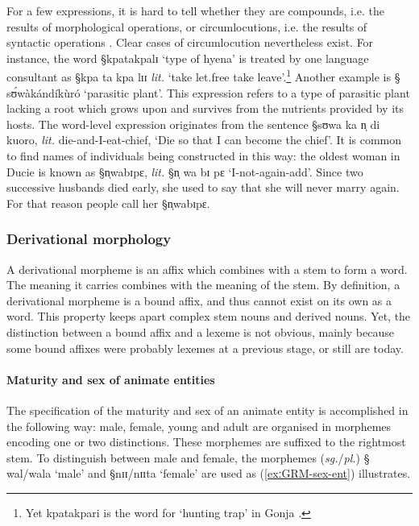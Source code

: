 For a few expressions,  it is hard to tell whether they are compounds, i.e. the
results of  morphological operations, or circumlocutions, i.e.  the results of
syntactic operations \cite[165]{Alla01}. Clear cases of circumlocution
nevertheless exist. For instance,  the word {\S kpatakpalɪ} `type of hyena'  is
treated by one language consultant as {\S kpa ta kpa lɪɪ} {\it lit.}
 `take let.free take leave'.\footnote{Yet {\F kpatakpari} is the word for
`hunting trap' in Gonja \citep{Rytz66}.}  Another example is {\S
sʊ́wàkándíkùró} `parasitic plant'. This expression refers to a type of
parasitic plant lacking a  root which grows upon and survives from the
nutrients provided by its  hosts. The word-level expression originates from the
sentence  {\S sʊwa ka n̩ di kuoro}, {\it lit.}  die-and-I-eat-chief, `Die so
that I can become the chief'. It is common to find names of individuals being
constructed in this way: the oldest woman in Ducie is known as {\S n̩wabɪpɛ}, 
{\it lit.}  {\S n̩ wa bɪ pɛ}  `I-not-again-add'. Since two successive husbands 
died early,  she used to say that she will never marry again. For that reason
people call her {\S n̩wabɪpɛ}.  



\subsubsection{Derivational morphology}
\label{sec:GRM-der-morph}

A derivational morpheme is an affix which combines with a stem to form a word.
The meaning it carries combines with the meaning of the stem.     By definition,
a derivational morpheme is a bound affix, and  thus 
cannot exist on its own as a word. This property keeps apart complex
stem nouns and derived nouns. Yet, the distinction between a bound affix and
a lexeme is not obvious, mainly because some bound affixes were probably lexemes
at a previous stage, or still are today. 


\paragraph{Maturity and sex of animate entities}
\label{sec:GRM-der-matur}


The specification of the maturity
and sex of an animate entity is accomplished in the following
way: male, female, young and adult are organised in morphemes encoding
one or two distinctions. These morphemes are suffixed to the rightmost stem.
To distinguish between male and female, the morphemes ({\it sg.}/{\it pl.}) {\S
wal/wala} `male'  and {\S nɪɪ/nɪɪta} `female'  are used as
(\ref{exːGRM-sex-ent}) illustrates.


